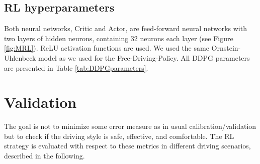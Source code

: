 \documentclass[review]{elsarticle}
\providecommand{\3}{{\ss}}
\begin{document}
\subsection{RL hyperparameters}
Both neural networks, Critic and Actor, are feed-forward neural networks with two layers of hidden neurons, containing 32 neurons each layer (see Figure \ref{fig:MRL}). ReLU activation functions are used. We used the same Ornstein-Uhlenbeck model as we used for the Free-Driving-Policy.
All DDPG parameters are presented in Table \ref{tab:DDPGparameters}.


%








\section{Validation}

The goal is not to minimize some error measure as in usual
calibration/validation but to check if the driving style is safe,
effective, and comfortable. The RL strategy is evaluated with respect to these metrics in different driving scenarios, described in the following.
\end{document}
